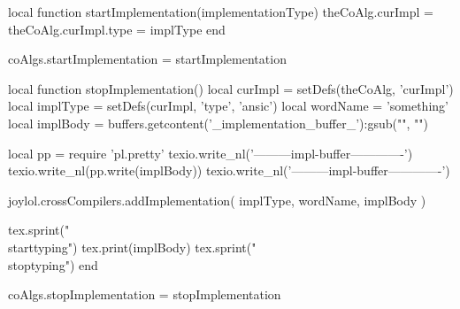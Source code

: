 \startLuaCode
local function startImplementation(implementationType)
  theCoAlg.curImpl      = { }
  theCoAlg.curImpl.type = implType
end

coAlgs.startImplementation = startImplementation

local function stopImplementation()
  local curImpl  = setDefs(theCoAlg, 'curImpl')
  local implType = setDefs(curImpl, 'type', 'ansic')
  local wordName = 'something'
  local implBody = buffers.getcontent('_implementation_buffer_'):gsub("", "\n")

  local pp = require 'pl.pretty'
  texio.write_nl('---------impl-buffer-------------')
  texio.write_nl(pp.write(implBody))
  texio.write_nl('---------impl-buffer-------------')

  joylol.crossCompilers.addImplementation(
    implType,
    wordName,
    implBody
  )

  tex.sprint("\\starttyping")
  tex.print(implBody)
  tex.sprint("\\stoptyping")
end

coAlgs.stopImplementation = stopImplementation
\stopLuaCode
